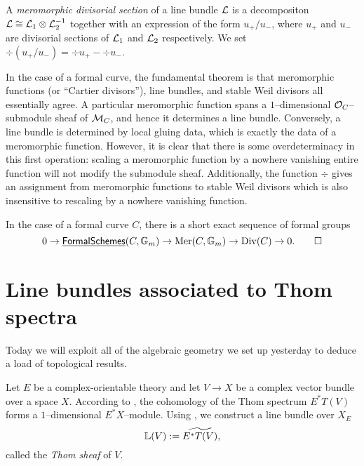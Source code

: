 \begin{definition}
A \textit{meromorphic divisorial section} of a line bundle $\mathcal{L}$ is a decompositon $\mathcal{L} \cong \mathcal{L}_1 \otimes \mathcal{L}_2^{-1}$ together with an expression of the form $u_+ / u_-$, where $u_+$ and $u_-$ are divisorial sections of $\mathcal{L}_1$ and $\mathcal{L}_2$ respectively.  We set $\div(u_+ / u_-) = \div u_+ - \div u_-$.
\end{definition}

In the case of a formal curve, the fundamental theorem is that meromorphic functions (or ``Cartier divisors''), line bundles, and stable Weil divisors all essentially agree.  A particular meromorphic function spans a $1$--dimensional $\mathcal{O}_C$--submodule sheaf of $\mathcal{M}_C$, and hence it determines a line bundle.  Conversely, a line bundle is determined by local gluing data, which is exactly the data of a meromorphic function.  However, it is clear that there is some overdeterminacy in this first operation: scaling a meromorphic function by a nowhere vanishing entire function will not modify the submodule sheaf.  Additionally, the function $\div$ gives an assignment from meromorphic functions to stable Weil divisors which is also insensitive to rescaling by a nowhere vanishing function.

\begin{theorem}
In the case of a formal curve $C$, there is a short exact sequence of formal groups \[0 \to \operatorname{\underline{\smash{\mathsf{FormalSchemes}}}}(C, \mathbb G_m) \to \operatorname{Mer}(C, \mathbb G_m) \to \operatorname{Div}(C) \to 0. \qed\]
\end{theorem}











\section{Line bundles associated to Thom spectra}\label{ProjectivizationLecture}

Today we will exploit all of the algebraic geometry we set up yesterday to deduce a load of topological results.

\begin{definition}\label{DefnThomSheaf}
Let $E$ be a complex-orientable theory and let $V \to X$ be a complex vector bundle over a space $X$.  According to , the cohomology of the Thom spectrum $E^* T(V)$ forms a $1$--dimensional $E^* X$--module.  Using , we construct a line bundle over $X_E$ \[\mathbb{L}(V) := \widetilde{E^* T(V)},\] called the \textit{Thom sheaf} of $V$.
\end{definition}

